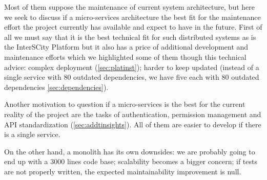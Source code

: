 \documentclass[paper=a4, fontsize=11pt]{scrartcl}
\numberwithin{equation}{section}    %
\numberwithin{figure}{section}      %
\numberwithin{table}{section}        %
\begin{document}
  Most of them suppose the maintenance of current system architecture, but here we seek to discuss if a micro-services architecture the best fit for the maintenance effort the project currently has available and expect to have in the future. First of all we must say that it is the best technical fit for such distributed systems as is the InterSCity Platform but it also has a price of additional development and maintenance efforts which we highlighted some of them though this technical advice: complex deployment (\ref{sec:platinst}); harder to keep updated (instead of a single service with 80 outdated dependencies, we have five each with 80 outdated dependencies \ref{sec:dependencies}).

  Another motivation to question if a micro-services is the best for the current reality of the project are the tasks of authentication, permission management and API standardization (\ref{sec:addtinsights}). All of them are easier to develop if there is a single service.

  On the other hand, a monolith has its own downsides: we are probably going to end up with a 3000 lines code base; scalability becomes a bigger concern; if tests are not properly written, the expected maintainability improvement is null.
\end{document}
